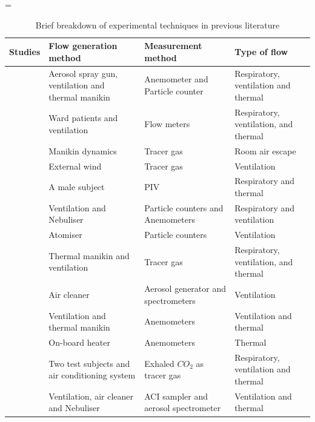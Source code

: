 \documentclass[a4paper,12pt]{elsarticle}
\begin{document}
\begin{center}
\captionsetup{font=normalsize}
\footnotesize
\LTcapwidth=\textwidth
\begin{longtable}{|m{3.55cm}|m{3.5cm}|m{3.5cm}|m{3.5cm}|}
\caption{Brief breakdown of experimental techniques in previous literature}
\label{tab:exp}\\
    \hline
    \centering\textbf{Studies} & \centering\textbf{Flow generation method} & \centering \textbf{Measurement method} & \centering\textbf{Type of flow}\\
    \hline
    \citet{berrouk2010experimental}& Aerosol spray gun, ventilation and thermal manikin & Anemometer and Particle counter & Respiratory, ventilation and thermal\\
    \hline
    \citet{li2005role} & Ward patients and ventilation & Flow meters & Respiratory, ventilation, and thermal\\
    \hline
    \citet{saarinen2015large} & Manikin dynamics & Tracer gas & Room air escape \\
    \hline
    \citet{jiang2009investigating}& External wind & Tracer gas & Ventilation\\
    \hline
    \citet{faleiros2022tu}& A male subject & PIV & Respiratory and thermal\\
    \hline
    \citet{romano2015numerical}& Ventilation and Nebuliser & Particle counters and Anemometers & Respiratory and ventilation\\
    \hline
    \citet{quintero2022reducing}& Atomiser & Particle counters & Ventilation \\
    \hline
    \citet{hang2015potential}& Thermal manikin and ventilation & Tracer gas & Respiratory, ventilation, and thermal \\
    \hline
    \citet{jain2023numerical}& Air cleaner & Aerosol generator and spectrometers & Ventilation \\
    \hline
    \citet{li2023numerical}& Ventilation and thermal manikin & Anemometers  & Ventilation and thermal \\
    \hline
    \citet{ho2021modeling}& On-board heater & Anemometers & Thermal\\
    \hline
    \citet{deng2021control}& Two test subjects and air conditioning system & Exhaled $CO_2$ as tracer gas & Respiratory, ventilation and thermal\\
    \hline
    \citet{oksanen2022combining}& Ventilation, air cleaner and Nebuliser & ACI sampler and aerosol spectrometer & Ventilation and thermal\\

\end{longtable}
\end{center}
\end{document}
